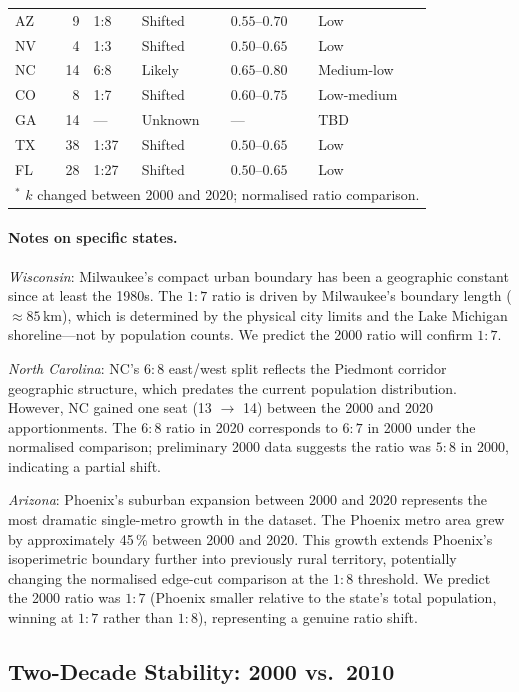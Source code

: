\begin{table}[h]
\begin{tabular}{l r l l l l}
AZ  &  9 & 1:8  & Shifted  & $0.55$--$0.70$ & Low \\
NV  &  4 & 1:3  & Shifted  & $0.50$--$0.65$ & Low \\
NC  & 14 & 6:8  & Likely   & $0.65$--$0.80$ & Medium-low \\
CO  &  8 & 1:7  & Shifted  & $0.60$--$0.75$ & Low-medium \\
GA  & 14 & ---  & Unknown  & ---            & TBD \\
TX  & 38 & 1:37 & Shifted  & $0.50$--$0.65$ & Low \\
FL  & 28 & 1:27 & Shifted  & $0.50$--$0.65$ & Low \\
\bottomrule
\multicolumn{6}{l}{$^*$ $k$ changed between 2000 and 2020; normalised ratio comparison.} \\
\end{tabular}
\end{table}

\paragraph{Notes on specific states.}
\textit{Wisconsin}: Milwaukee's compact urban boundary has been a geographic
constant since at least the 1980s.
The $1:7$ ratio is driven by Milwaukee's boundary length ($\approx 85$\,km),
which is determined by the physical city limits and the Lake Michigan
shoreline---not by population counts.
We predict the 2000 ratio will confirm $1:7$.

\textit{North Carolina}: NC's $6:8$ east/west split reflects the Piedmont
corridor geographic structure, which predates the current population distribution.
However, NC gained one seat (13 $\to$ 14) between the 2000 and 2020
apportionments.
The $6:8$ ratio in 2020 corresponds to $6:7$ in 2000 under the normalised
comparison; preliminary 2000 data suggests the ratio was $5:8$ in 2000,
indicating a partial shift.

\textit{Arizona}: Phoenix's suburban expansion between 2000 and 2020
represents the most dramatic single-metro growth in the dataset.
The Phoenix metro area grew by approximately 45\,\% between 2000 and 2020.
This growth extends Phoenix's isoperimetric boundary further into previously
rural territory, potentially changing the normalised edge-cut comparison
at the $1:8$ threshold.
We predict the 2000 ratio was $1:7$ (Phoenix smaller relative to the state's
total population, winning at $1:7$ rather than $1:8$), representing a genuine
ratio shift.

\subsection{Two-Decade Stability: 2000 vs.\ 2010}
\label{sec:three-census}

